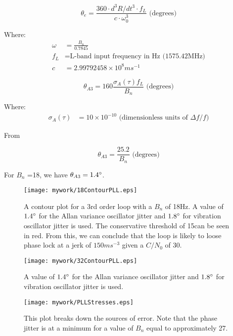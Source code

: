\begin{equation}
\theta_e = \frac{360 \cdot d^3R/dt^3  \cdot f_L}{c  \cdot \omega^3_0} \text{ (degrees)}
\end{equation}


Where:
\begin{align*}
\omega &= \frac{B_n}{0.7845} \\
f_L &= \text{L-band input frequency in Hz (1575.42MHz)}\\ 
c & = 2.99792458 \times 10^8 ms^{-1}
\end{align*}




\begin{equation}
\theta_{A3} = 160 \frac{\sigma_A(\tau)f_L}{B_n} \text{ (degrees)}
\end{equation}

Where:
\begin{align*}
\sigma_A(\tau) &= 10 \times 10^{-10} \text{ (dimensionless units of }\Delta f/f\text{)}
\end{align*}

From \cite{VT803Datasheet}


\begin{equation}
\theta_{A3} =\frac{25.2}{B_n} \text{ (degrees)}
\end{equation}

For $B_n$ =18, we have $\theta_{A3}=1.4\degree$.


\begin{figure}[!htb] 
    \centering
    \texttt{[image: mywork/18ContourPLL.eps]} 
    \caption{A contour plot for a 3rd order loop with a $B_n$ of 18Hz. A value of $1.4\degree$ for the Allan variance oscillator jitter and $1.8\degree$ for vibration oscillator jitter is used. The conservative threshold of 15\degree can be seen in red. From this, we can conclude that the loop is likely to loose phase lock at a jerk of $150ms^{-3}$ given a $C/N_0$ of 30.}
\end{figure}

\begin{figure}[!htb] 
    \centering
    \texttt{[image: mywork/32ContourPLL.eps]} 
    \caption{A value of $1.4\degree$ for the Allan variance oscillator jitter and $1.8\degree$ for vibration oscillator jitter is used.}
\end{figure}


\begin{figure}[!htb] 
    \centering
    \texttt{[image: mywork/PLLStresses.eps]} 
    \caption{This plot breaks down the sources of error. Note that the phase jitter is at a minimum for a value of $B_n$ equal to approximately 27.}
\end{figure}


